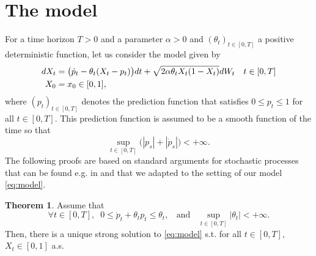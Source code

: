 \documentclass[11pt]{article}
\theoremstyle{definition}
\newtheorem{Thm}[Def]{Theorem}
\begin{document}
\section{The model}
For a time horizon $T>0$ and  a parameter $\alpha > 0$ and $(\theta_t)_{t\in[0,T]}$ a positive deterministic  function,  let us consider the model  given by
\begin{align}\label{eq:model}
dX_t&= \big(\dot p_t - \theta_t(X_t-p_t)  \big)dt  +\sqrt{2\alpha \theta_tX_t(1-X_t)} dW_t\quad t\in[0,T]\\
X_0&=x_0\in[0,1],\notag
\end{align}
where $(p_t)_{t\in[0,T]}$ denotes the prediction function that satisfies $0\le p_t\le 1$ for all $t\in[0,T]$. This prediction function is assumed to be a smooth function of the time so that 
$$\sup_{t\in[0,T]}\bigl( |p_s| + |\dot p_s|\big) <+\infty .$$
The following proofs are based on standard arguments for stochastic processes that can be found e.g. in \cite{Alf} and \cite{KarShr} that we adapted to the setting of our model \eqref{eq:model}.
\begin{Thm}\label{thm:exun}
Assume that    
\begin{equation}\label{Assumption:1}
\forall  t\in[0,T],\;\; 0\le \dot p_t +\theta_tp_t\le \theta_t, \;\;\mbox{ and }\;\;
\sup_{t\in[0,T]}|\theta_t|<+\infty\tag{A}. 
\end{equation}
Then, there is a unique strong solution to \eqref{eq:model} s.t.  for all $t\in[0,T]$, $X_t\in[0,1]$ a.s.
\end{Thm}
\end{document}

